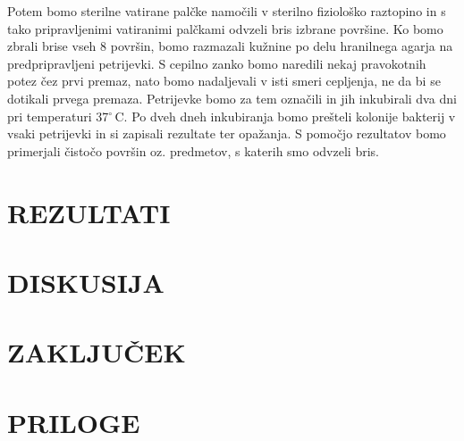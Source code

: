 \documentclass[12pt, a4paper]{report}
\begin{document}
Potem bomo sterilne vatirane palčke namočili v sterilno fiziološko raztopino in s tako pripravljenimi vatiranimi palčkami odvzeli bris izbrane površine. Ko bomo zbrali brise vseh 8 površin, bomo razmazali kužnine po delu hranilnega agarja na predpripravljeni petrijevki. S cepilno zanko bomo naredili nekaj pravokotnih potez čez prvi premaz, nato bomo nadaljevali v isti smeri cepljenja, ne da bi se dotikali prvega premaza. Petrijevke bomo za tem označili in jih inkubirali dva dni pri temperaturi 37$^\circ$\,C. Po dveh dneh inkubiranja bomo prešteli kolonije bakterij v vsaki petrijevki in si zapisali rezultate ter opažanja. S pomočjo rezultatov bomo primerjali čistočo površin oz. predmetov, s katerih smo odvzeli bris.

\chapter{REZULTATI}

\chapter{DISKUSIJA}

\chapter{ZAKLJUČEK}

\chapter{PRILOGE}
\end{document}
